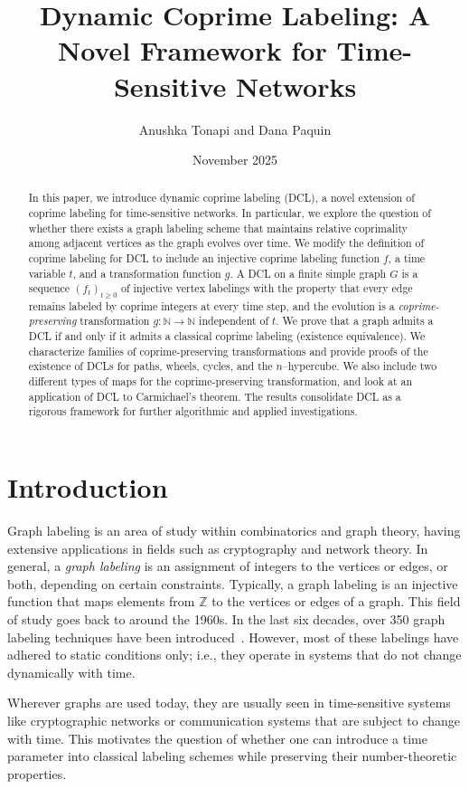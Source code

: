 \documentclass[12pt]{amsart}
\title[Dynamic Coprime Labeling]{Dynamic Coprime Labeling: A Novel Framework for Time-Sensitive Networks}
\author{Anushka Tonapi and Dana Paquin}
\date{November 2025}
\theoremstyle{plain}
\theoremstyle{definition}
\theoremstyle{remark}
\numberwithin{equation}{section}
\begin{document}
\begin{abstract}
In this paper, we introduce dynamic coprime labeling (DCL), a novel extension of coprime labeling for time-sensitive networks. In particular, we explore the question of whether there exists a graph labeling scheme that maintains relative coprimality among adjacent vertices as the graph evolves over time. We modify the definition of coprime labeling for DCL to include an injective coprime labeling function $f$, a time variable $t$, and a transformation function $g$. A DCL on a finite simple graph $G$ is a sequence $(f_t)_{t\ge 0}$ of injective vertex labelings with the property that every edge remains labeled by coprime integers at every time step, and the evolution is a \emph{coprime-preserving} transformation $g:\mathbb{N}\to\mathbb{N}$ independent of $t$. We prove that a graph admits a DCL if and only if it admits a classical coprime labeling (existence equivalence). We characterize families of coprime-preserving transformations and provide proofs of the existence of DCLs for paths, wheels, cycles, and the $n$--hypercube. We also include two different types of maps for the coprime-preserving transformation, and look at an application of DCL to Carmichael's theorem. The results consolidate DCL as a rigorous framework for further algorithmic and applied investigations.
\end{abstract}

\maketitle

\section{Introduction}
\noindent
Graph labeling is an area of study within combinatorics and graph theory, having extensive applications in fields such as cryptography and network theory. In general, a \emph{graph labeling} is an assignment of integers to the vertices or edges, or both, depending on certain constraints. Typically, a graph labeling is an injective function that maps elements from $\mathbb{Z}$ to the vertices or edges of a graph. This field of study goes back to around the 1960s. In the last six decades, over 350 graph labeling techniques have been introduced~\cite{gallian}. However, most of these labelings have adhered to static conditions only; i.e., they operate in systems that do not change dynamically with time.

Wherever graphs are used today, they are usually seen in time-sensitive systems like cryptographic networks or communication systems that are subject to change with time. This motivates the question of whether one can introduce a time parameter into classical labeling schemes while preserving their number-theoretic properties.
\end{document}
